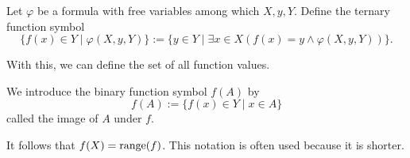 \documentclass[../main.tex]{subfiles}
\begin{document}
\begin{definition}
    Let $\varphi$ be a formula with free variables among which $X,y,Y$.
    Define the ternary function symbol
    \begin{equation*}
        \{f(x)\in Y\mid\varphi(X,y,Y)\}:=\{y\in Y\mid\exists x\in X(f(x)=y\land\varphi(X,y,Y))\}.
    \end{equation*}
\end{definition}
With this, we can define the set of all function values.
\begin{definition}
    We introduce the binary function symbol $f(A)$ by
    \begin{equation*}
        f(A):=\{f(x)\in Y\mid x\in A\}
    \end{equation*}
    called the image of $A$ under $f$.
\end{definition}
It follows that $f(X)=\operatorname{range}(f)$. This notation is often used because it is shorter.
\end{document}
